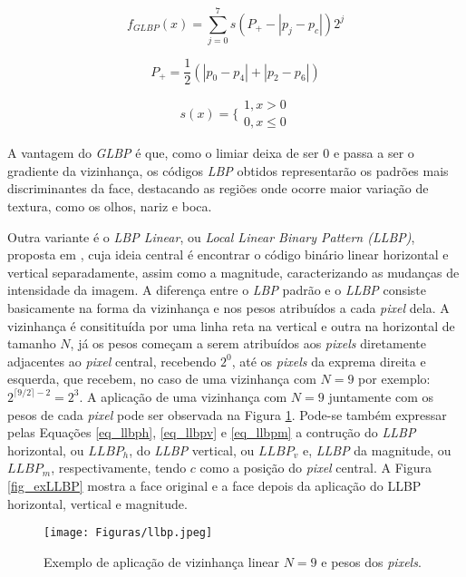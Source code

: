 \documentclass[conference]{IEEEtran}
\begin{document}
\begin{equation}
f_{GLBP}(x) = \sum_{j=0}^{7} s(P_{+} - |p_j - p_c|)2^{j}
\label{eq_glbp1}
\end{equation} 

\begin{equation}
P_{+} = \frac{1}{2}(|p_0 - p_4|+|p_2 - p_6|)
\label{eq_glbp2}
\end{equation}

\begin{equation}
s(x) = \lbrace\begin{array}{c}
 1, x>0
   \\
 0, x\leq 0
\end{array}
\label{eq_glbp_limiar}
\end{equation}

A vantagem do \textit{GLBP} é que, como o limiar deixa de ser $0$ e passa a ser o gradiente da vizinhança, os códigos \textit{LBP} obtidos representarão os padrões mais discriminantes da face, destacando as regiões onde ocorre maior variação de textura, como os olhos, nariz e boca.

Outra variante é o \textit{LBP Linear}, ou \textit{Local Linear Binary Pattern (LLBP)}, proposta em \cite{petpon}, cuja ideia central é encontrar o código binário linear horizontal e vertical separadamente, assim como a magnitude, caracterizando as mudanças de intensidade da imagem. A diferença entre o \textit{LBP} padrão e o \textit{LLBP} consiste basicamente na forma da vizinhança e nos pesos atribuídos a cada \textit{pixel} dela. A vizinhança é consitituída por uma linha reta na vertical e outra na horizontal de tamanho $N$, já os pesos começam a serem atribuídos aos \textit{pixels} diretamente adjacentes ao \textit{pixel} central, recebendo $2^{0}$, até os \textit{pixels} da exprema direita e esquerda, que recebem, no caso de uma vizinhança com $N=9$ por exemplo: $2^{\lceil 9/2 \rceil -2} = 2^{3}$. A aplicação de uma vizinhança com $N=9$ juntamente com os pesos de cada \textit{pixel} pode ser observada na Figura \ref{fig_llbp}. Pode-se também expressar pelas Equações \ref{eq_llbph}, \ref{eq_llbpv} e \ref{eq_llbpm} a contrução do \textit{LLBP} horizontal, ou $LLBP_h$, do \textit{LLBP} vertical, ou $LLBP_v$ e, \textit{LLBP} da magnitude, ou $LLBP_m$, respectivamente, tendo $c$ como a posição do \textit{pixel} central. A Figura \ref{fig_exLLBP} mostra a face original e a face depois da aplicação do LLBP horizontal, vertical e magnitude. 

\begin{figure}[h]
  \begin{center}
    \leavevmode
    \texttt{[image: Figuras/llbp.jpeg]}
    \caption{Exemplo de aplicação de vizinhança linear $N=9$ e pesos dos \textit{pixels}.}
    \label{fig_llbp}
  \end{center}
\end{figure}
\end{document}
